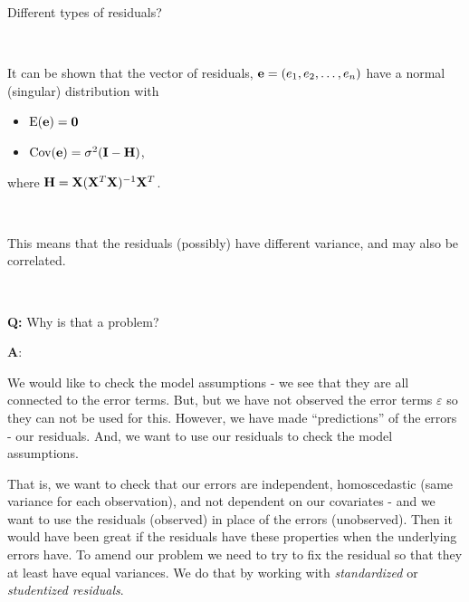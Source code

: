 \documentclass[10pt,ignorenonframetext,]{beamer}
\providecommand{\tightlist}{%
  \setlength{\itemsep}{0pt}\setlength{\parskip}{0pt}}
\begin{document}
\begin{frame}

\begin{block}{Different types of residuals?}

\(~\)

It can be shown that the vector of residuals,
\({\bf e}=(e_1,e_2,\ldots,e_n)\) have a normal (singular) distribution
with

\begin{itemize}
\tightlist
\item
  \(\text{E}({\bf e})={\bf 0}\)
\item
  \(\text{Cov}({\bf e})=\sigma^2({\bf I}-{\bf H})\),
\end{itemize}

where \({\bf H}={\bf X}({\bf X}^T{\bf X})^{-1}{\bf X}^T\).

\(~\)

This means that the residuals (possibly) have different variance, and
may also be correlated.

\(~\)

\textbf{Q:} Why is that a problem?

\end{block}

\end{frame}

\begin{frame}

\textbf{A}:

We would like to check the model assumptions - we see that they are all
connected to the error terms. But, but we have not observed the error
terms \(\varepsilon\) so they can not be used for this. However, we have
made ``predictions'' of the errors - our residuals. And, we want to use
our residuals to check the model assumptions.

That is, we want to check that our errors are independent, homoscedastic
(same variance for each observation), and not dependent on our
covariates - and we want to use the residuals (observed) in place of the
errors (unobserved). Then it would have been great if the residuals have
these properties when the underlying errors have. To amend our problem
we need to try to fix the residual so that they at least have equal
variances. We do that by working with \emph{standardized} or
\emph{studentized residuals}.

\end{frame}
\end{document}
